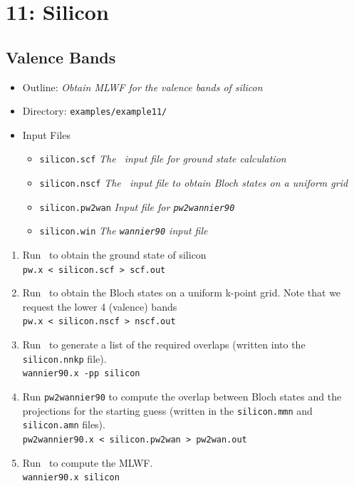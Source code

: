\documentclass[a4paper,11pt,twoside]{article}
\begin{document}
\cleardoublepage


\section*{11: Silicon}
\subsection*{Valence Bands}
\begin{itemize}
\item{Outline: \it{Obtain MLWF for the valence bands of silicon}}
\item{Directory: {\tt examples/example11/}}
\item{Input Files}
\begin{itemize}
\item{ {\tt silicon.scf}  {\it The \pwscf\ input file for ground state
    calculation}} 
\item{ {\tt silicon.nscf}  {\it The \pwscf\ input file to obtain Bloch
    states on a uniform grid}} 
\item{ {\tt silicon.pw2wan}  {\it Input file for {\tt pw2wannier90}}}
\item{ {\tt silicon.win}  {\it The {\tt wannier90} input file}}
\end{itemize}

\end{itemize}

\begin{enumerate}
\item Run \pwscf\ to obtain the ground state of silicon\\
{\tt pw.x < silicon.scf > scf.out}

\item Run \pwscf\ to obtain the Bloch states on a uniform k-point
  grid. Note that we request the lower 4 (valence) bands\\ 
{\tt pw.x < silicon.nscf > nscf.out}

\item Run \wannier\ to generate a list of the required overlaps (written
  into the {\tt silicon.nnkp} file).\\
{\tt wannier90.x -pp silicon}

\item Run {\tt pw2wannier90} to compute the overlap between Bloch
  states and the projections for the starting guess (written in the
  {\tt silicon.mmn} and {\tt  silicon.amn} files).\\
{\tt pw2wannier90.x < silicon.pw2wan > pw2wan.out}

\item Run \wannier\ to compute the MLWF.\\
{\tt wannier90.x silicon}

\end{enumerate}
\end{document}
